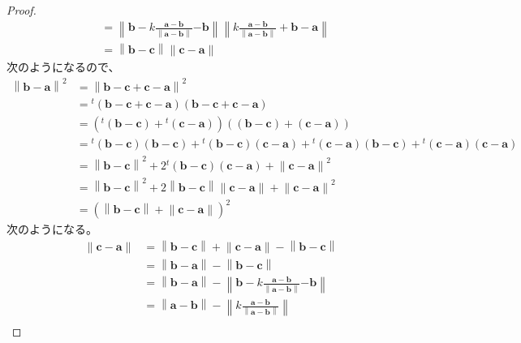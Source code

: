 \documentclass[dvipdfmx]{jsarticle}
\begin{document}
\begin{proof}
\begin{align*}
&= \left\| \mathbf{b} - k\frac{\mathbf{a} - \mathbf{b}}{\left\| \mathbf{a} - \mathbf{b} \right\|}\mathbf{- b} \right\|\left\| k\frac{\mathbf{a} - \mathbf{b}}{\left\| \mathbf{a} - \mathbf{b} \right\|} + \mathbf{b} - \mathbf{a} \right\|\\
&= \left\| \mathbf{b - c} \right\|\left\| \mathbf{c - a} \right\|
\end{align*}
次のようになるので、
\begin{align*}
\left\| \mathbf{b} - \mathbf{a} \right\|^{2} &= \left\| \mathbf{b} - \mathbf{c} + \mathbf{c} - \mathbf{a} \right\|^{2}\\
&={}^{t}\left( \mathbf{b} - \mathbf{c} + \mathbf{c} - \mathbf{a} \right)\left( \mathbf{b} - \mathbf{c} + \mathbf{c} - \mathbf{a} \right)\\
&= \left({}^{t}\left( \mathbf{b} - \mathbf{c} \right) +{}^{t}\left( \mathbf{c} - \mathbf{a} \right) \right)\left( \left( \mathbf{b} - \mathbf{c} \right) + \left( \mathbf{c} - \mathbf{a} \right) \right)\\
&={}^{t}\left( \mathbf{b} - \mathbf{c} \right)\left( \mathbf{b} - \mathbf{c} \right) +{}^{t}\left( \mathbf{b} - \mathbf{c} \right)\left( \mathbf{c} - \mathbf{a} \right) +{}^{t}\left( \mathbf{c} - \mathbf{a} \right)\left( \mathbf{b} - \mathbf{c} \right) +{}^{t}\left( \mathbf{c} - \mathbf{a} \right)\left( \mathbf{c} - \mathbf{a} \right)\\
&= \left\| \mathbf{b - c} \right\|^{2} + 2{}^{t}\left( \mathbf{b} - \mathbf{c} \right)\left( \mathbf{c} - \mathbf{a} \right) + \left\| \mathbf{c - a} \right\|^{2}\\
&= \left\| \mathbf{b - c} \right\|^{2} + 2\left\| \mathbf{b - c} \right\|\left\| \mathbf{c - a} \right\| + \left\| \mathbf{c - a} \right\|^{2}\\
&= \left( \left\| \mathbf{b - c} \right\| + \left\| \mathbf{c - a} \right\| \right)^{2}
\end{align*}
次のようになる。
\begin{align*}
\left\| \mathbf{c - a} \right\| &= \left\| \mathbf{b - c} \right\| + \left\| \mathbf{c - a} \right\| - \left\| \mathbf{b - c} \right\|\\
&= \left\| \mathbf{b} - \mathbf{a} \right\| - \left\| \mathbf{b - c} \right\|\\
&= \left\| \mathbf{b} - \mathbf{a} \right\| - \left\| \mathbf{b} - k\frac{\mathbf{a} - \mathbf{b}}{\left\| \mathbf{a} - \mathbf{b} \right\|}\mathbf{- b} \right\|\\
&= \left\| \mathbf{a} - \mathbf{b} \right\| - \left\| k\frac{\mathbf{a} - \mathbf{b}}{\left\| \mathbf{a} - \mathbf{b} \right\|} \right\|\\

\end{align*}
\end{proof}
\end{document}

